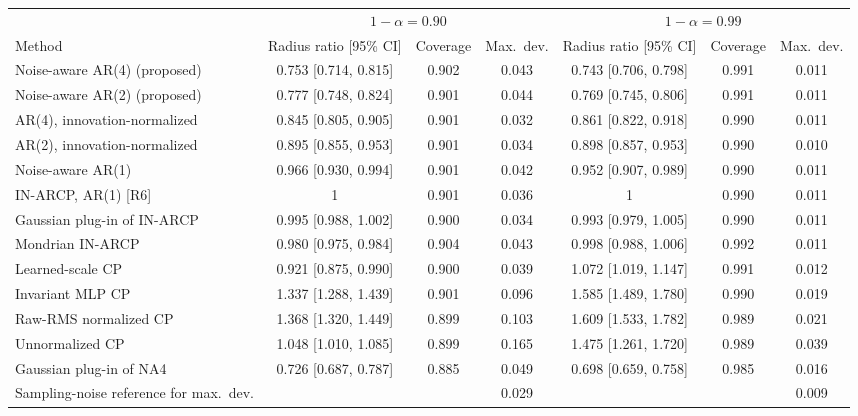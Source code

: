 \begin{tabular}{lcccccc}
\toprule
 & \multicolumn{3}{c}{$1-\alpha=0.90$} & \multicolumn{3}{c}{$1-\alpha=0.99$}\\
\cmidrule(lr){2-4}\cmidrule(lr){5-7}
Method & Radius ratio [95\% CI] & Coverage & Max.\ dev. & Radius ratio [95\% CI] & Coverage & Max.\ dev.\\
\midrule
Noise-aware AR(4) (proposed) & 0.753 [0.714, 0.815] & 0.902 & 0.043 & 0.743 [0.706, 0.798] & 0.991 & 0.011\\
Noise-aware AR(2) (proposed) & 0.777 [0.748, 0.824] & 0.901 & 0.044 & 0.769 [0.745, 0.806] & 0.991 & 0.011\\
AR(4), innovation-normalized & 0.845 [0.805, 0.905] & 0.901 & 0.032 & 0.861 [0.822, 0.918] & 0.990 & 0.011\\
AR(2), innovation-normalized & 0.895 [0.855, 0.953] & 0.901 & 0.034 & 0.898 [0.857, 0.953] & 0.990 & 0.010\\
Noise-aware AR(1) & 0.966 [0.930, 0.994] & 0.901 & 0.042 & 0.952 [0.907, 0.989] & 0.990 & 0.011\\
IN-ARCP, AR(1) [R6] & 1 & 0.901 & 0.036 & 1 & 0.990 & 0.011\\
Gaussian plug-in of IN-ARCP & 0.995 [0.988, 1.002] & 0.900 & 0.034 & 0.993 [0.979, 1.005] & 0.990 & 0.011\\
Mondrian IN-ARCP & 0.980 [0.975, 0.984] & 0.904 & 0.043 & 0.998 [0.988, 1.006] & 0.992 & 0.011\\
Learned-scale CP & 0.921 [0.875, 0.990] & 0.900 & 0.039 & 1.072 [1.019, 1.147] & 0.991 & 0.012\\
Invariant MLP CP & 1.337 [1.288, 1.439] & 0.901 & 0.096 & 1.585 [1.489, 1.780] & 0.990 & 0.019\\
Raw-RMS normalized CP & 1.368 [1.320, 1.449] & 0.899 & 0.103 & 1.609 [1.533, 1.782] & 0.989 & 0.021\\
Unnormalized CP & 1.048 [1.010, 1.085] & 0.899 & 0.165 & 1.475 [1.261, 1.720] & 0.989 & 0.039\\
Gaussian plug-in of NA4 & 0.726 [0.687, 0.787] & 0.885 & 0.049 & 0.698 [0.659, 0.758] & 0.985 & 0.016\\
\midrule
Sampling-noise reference for max.\ dev. & & & 0.029 & & & 0.009\\
\bottomrule
\end{tabular}
